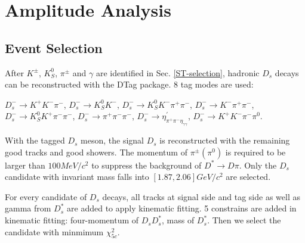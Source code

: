 \section{Amplitude Analysis}

\subsection{Event Selection}
\label{AASelection}
\par{
After $K^{\pm}$, $K_S^{0}$, $\pi^{\pm}$ and $\gamma$ are identified in Sec. \ref{ST-selection}, hadronic $D_{s}$ decays can be reconstructed with the DTag package. 8 tag modes are used:

$D_{s}^{-} \rightarrow K^{+}K^{-}\pi^{-}$, $D_{s}^{-} \rightarrow K_{S}^{0}K^{-}$, $D_{s}^{-} \rightarrow K_{S}^{0}K^{-}\pi^{+}\pi^{-}$, $D_{s}^{-} \rightarrow K^{-}\pi^{+}\pi^{-}$, $D_{s}^{-} \rightarrow K_{S}^{0}K^{+}\pi^{-}\pi^{-}$, $D_{s}^{-} \rightarrow \pi^{+}\pi^{-}\pi^{-}$, $D_{s}^{-} \rightarrow \eta^{'}_{\pi^{+}\pi^{-}\eta_{\gamma\gamma}}$, $D_{s}^{-} \rightarrow K^{+}K^{-}\pi^{-}\pi^{0}$.


With the tagged $D_{s}$ meson, the signal $D_{s}$ is reconstructed with the remaining good tracks and good showers. 
The momentum of $\pi^{\pm}(\pi^{0})$ is required to be larger than $100 MeV/c^{2}$ to suppress the background of $D^{*} \rightarrow D\pi$.
Only the $D_{s}$ candidate with invariant mass falls into $[1.87, 2.06]GeV/c^{2}$ are selected.

For every candidate of $D_{s}$ decays, all tracks at signal side and tag side as well as gamma from $D_{s}^{*}$ are added to apply kinematic fitting. 5 constrains are added in kinematic fitting: four-momentum of $D_{s}D_{s}^{*}$, mass of $D_{s}^{*}$. Then we select the candidate with minmimum $\chi_{5c}^{2}$.  

}
